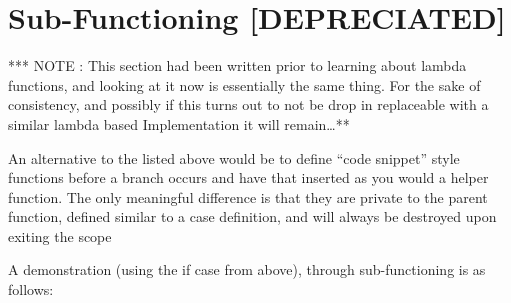 \documentclass{article}
\newcommand{\clfootnote}[3]{\color{#2}{\footnote{\label{#1}{ \color{#2}{#3}}}}\color{defaultcolor}}
\begin{document}
    \newpage
    \section{Sub-Functioning [DEPRECIATED]}

        *** NOTE : This section had been written prior to learning about lambda functions, and looking at it now is essentially the same thing. For the sake of consistency, and possibly if this turns out to not be drop in replaceable with a similar lambda based Implementation it will remain\dots ***

    \bigskip
        An alternative to the listed above would be to define ``code snippet'' style functions before a branch occurs and have that inserted as you would a helper function. The only meaningful difference is that they are private to the parent function, defined similar to a case definition, and will always be destroyed upon exiting the scope\clfootnote{SFunctionDestructionNote}{red}{This includes forbidding that function from being passed out of scope, this can be justified due to that use-case necessitating the creation of a public function already defined of scope NOT a sub-function within THIS scope\dots}

    \bigskip
        A demonstration (using the if case from above), through sub-functioning is as follows\clfootnote{SFunctionCompilerNote}{blue}{interestingly enough this ``should'' compile exactly like the above example with the sub-function acting as an alias for the compiler to swap the logic with, the exception being that shared then branches will ALSO need sub-functions that can be input into those localities, which removes the nesting seen in the above pre-compilation solution}:
    
\end{document}
